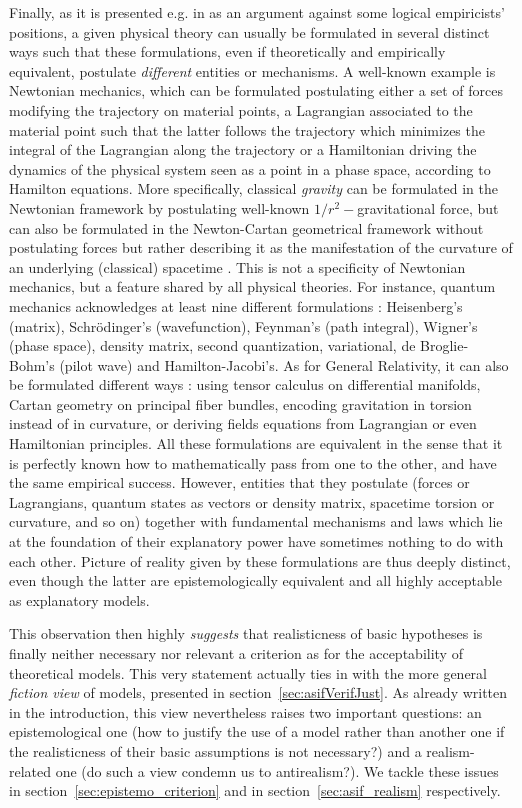 \documentclass[a4paper,11pt]{article}
\theoremstyle{definition}
\begin{document}
Finally, as it is presented e.g. in \citep{Suppe2000} as an argument against some logical empiricists' positions, a given physical theory can usually be formulated in several distinct ways such that these formulations, even if theoretically and empirically equivalent, postulate \textit{different} entities or mechanisms. A well-known example is Newtonian mechanics, which can be formulated postulating either a set of forces modifying the trajectory on material points, a Lagrangian associated to the material point such that the latter follows the trajectory which minimizes the integral of the Lagrangian along the trajectory or a Hamiltonian driving the dynamics of the physical system seen as a point in a phase space, according to Hamilton equations. More specifically, classical \textit{gravity} can be formulated in the Newtonian framework by postulating well-known $1/r^2-$gravitational force, but can also be formulated in the Newton-Cartan geometrical framework without postulating forces but rather describing it as the manifestation of the curvature of an underlying (classical) spacetime \citep[Chapter~1]{Ehlers1973}. This is not a specificity of Newtonian mechanics, but a feature shared by all physical theories. For instance, quantum mechanics acknowledges at least nine different formulations \citep{Styer2002}: Heisenberg's (matrix), Schrödinger's (wavefunction), Feynman's (path integral), Wigner's (phase space), density matrix, second quantization, variational, de Broglie-Bohm's (pilot wave) and Hamilton-Jacobi's. As for General Relativity, it can also be formulated different ways \citep{Goeckeler2011, Krasnov2020, Arnowitt2008}: using tensor calculus on differential manifolds, Cartan geometry on principal fiber bundles, encoding gravitation in torsion instead of in curvature, or deriving fields equations from Lagrangian or even Hamiltonian principles. All these formulations are equivalent in the sense that it is perfectly known how to mathematically pass from one to the other, and have the same empirical success. However, entities that they postulate (forces or Lagrangians, quantum states as vectors or density matrix, spacetime torsion or curvature, and so on) together with fundamental mechanisms and laws which lie at the foundation of their explanatory power have sometimes nothing to do with each other. Picture of reality given by these formulations are thus deeply distinct, even though the latter are epistemologically equivalent and all highly acceptable as explanatory models. 

This observation then highly \textit{suggests} that realisticness of basic hypotheses is finally neither necessary nor relevant a criterion as for the acceptability of theoretical models. This very statement actually ties in with the more general \textit{fiction view} of models, presented in section~\ref{sec:asifVerifJust}. As already written in the introduction, this view nevertheless raises two important questions: an epistemological one (how to justify the use of a model rather than another one if the realisticness of their basic assumptions is not necessary?) and a realism-related one (do such a view condemn us to antirealism?). We tackle these issues in section~\ref{sec:epistemo_criterion} and in section~\ref{sec:asif_realism} respectively.
\end{document}
